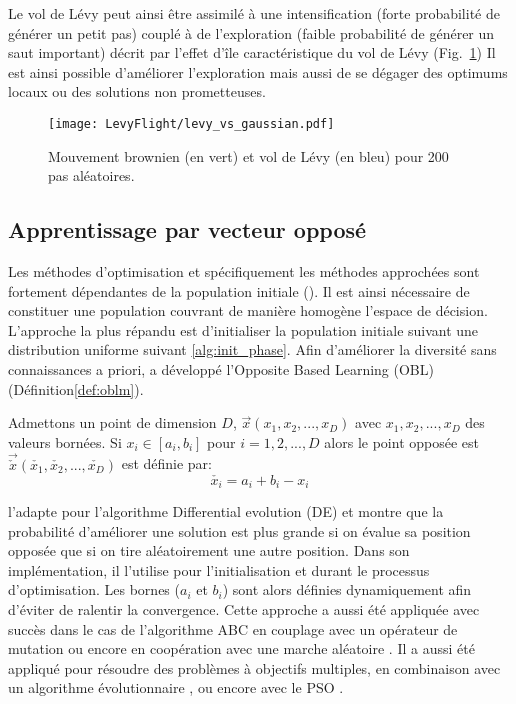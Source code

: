 Le vol de Lévy peut ainsi être assimilé à une intensification (forte probabilité de générer un petit pas)
couplé à de l’exploration (faible probabilité de générer un saut important) décrit par
l’effet d’île caractéristique du vol de Lévy (Fig.~\ref{fig:levy_vs_gaussian})
Il est ainsi possible d’améliorer l’exploration mais aussi de se dégager des optimums locaux
ou des solutions non prometteuses.

\begin{figure}
    \begin{center}
        \texttt{[image: LevyFlight/levy\_vs\_gaussian.pdf]}
    \end{center}
    \caption{Mouvement brownien (en vert) et vol de Lévy (en bleu) pour 200 pas aléatoires.
             \label{fig:levy_vs_gaussian}}
\end{figure}
\FloatBarrier


\subsection{Apprentissage par vecteur opposé} %
\label{sub:apprentissage_par_vecteur_oppose}
Les méthodes d’optimisation et spécifiquement les méthodes approchées sont fortement
dépendantes de la population initiale (). Il est ainsi nécessaire
de constituer une population couvrant de manière homogène l’espace de décision.
L’approche la plus répandu est d’initialiser la population initiale suivant une
distribution uniforme suivant \eqref{alg:init_phase}.
Afin d’améliorer la diversité sans connaissances a priori,\cite{Tizhoosh2005695}
a développé l’Opposite Based Learning (OBL) (Définition\ref{def:oblm}).

\begin{Def}\label{def:oblm}
Admettons un point de dimension $D$, $\vec{x}(x_{1}, x_{2}, ..., x_{D})$ avec
$x_{1}, x_{2}, ..., x_{D}$ des valeurs bornées. Si $x_{i} \in [a_{i}, b_{i}]$ pour
$i = 1, 2, ..., D$ alors le point opposée est $\vec{\check{x}}(\check{x_{1}}, \check{x_{2}}, ..., \check{x_{D}})$ est définie par:
\[\check{x_{i}} = a_{i} + b_{i} - x_{i}\]
\end{Def}

\cite{Rahnamayan2008906} l’adapte pour l’algorithme Differential evolution (DE)
et montre que la probabilité d’améliorer une solution est plus grande
si on évalue sa position opposée que si on tire aléatoirement une autre position.
Dans son implémentation, il l’utilise pour l’initialisation et durant le processus
d’optimisation. Les bornes ($a_{i}$ et $b_{i}$) sont alors définies dynamiquement
afin d’éviter de ralentir la convergence.
Cette approche a aussi été appliquée avec succès dans le cas de l’algorithme ABC en couplage
avec un opérateur de mutation \parencite{Bi2011174} ou encore en coopération avec une marche
aléatoire \parencite{Sharma2012213}.
Il a aussi été appliqué pour résoudre des problèmes à objectifs multiples,
en combinaison avec un algorithme évolutionnaire \parencite{Ma201448}, ou encore avec
le PSO \parencite{Gao2013114}.

